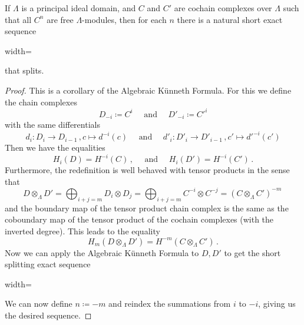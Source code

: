 \begin{corollary}
	If $\Lambda$ is a principal ideal domain, and $C$ and $C'$ are cochain complexes over $\Lambda$ such that all $C^n$ are free $\Lambda$-modules, then for each $n$ there is a natural short exact sequence 
	\begin{center}
		\begin{adjustbox}{width=\textwidth}
		\end{adjustbox}
	\end{center}that splits.
\end{corollary}
\begin{proof}
	This is a corollary of the Algebraic Künneth Formula. For this we define the chain complexes \begin{equation*}
		D_{-i}\coloneq C^i\quad \text{ and }\quad {D'}_{-i}\coloneq {C'}^i
	\end{equation*}with the same differentials 
	\begin{equation*}
		d_i: D_i \to D_{i-1}\,,c\mapsto d^{-i}(c)  \quad \text{ and }\quad {d'}_i: {D'}_i\to {D'}_{i-1}\,,c'\mapsto d'^{-i}(c')
	\end{equation*}
	Then we have the equalities 
	\begin{equation*}
		H_i(D)=H^{-i}(C)\,,\quad \text{ and }\quad H_i(D')=H^{-i}(C')\,.
	\end{equation*} Furthermore, the redefinition is well behaved with tensor products in the sense that
	\begin{equation*}
		D\otimes_\Lambda D'=\bigoplus_{i+j=m}D_i\otimes D_j =\bigoplus_{i+j=m}C^{-i}\otimes C^{-j}=(C\otimes_{\Lambda}C')^{-m}\,
	\end{equation*}and the boundary map of the tensor product chain complex is the same as the coboundary map of the tensor product of the cochain complexes (with the inverted degree).
	This leads to the equality
	\begin{equation*}
		H_m(D\otimes_\Lambda D')=H^{-m}(C\otimes_\Lambda C')\,.
	\end{equation*}
	Now we can apply the Algebraic Künneth Formula to $D,D'$ to get the short splitting exact sequence
	\begin{center}
		\begin{adjustbox}{width=\textwidth}
		\end{adjustbox}
	\end{center} We can now define $n\coloneq -m$ and reindex the summations from $i$ to $-i$, giving us the desired sequence.
\end{proof}

